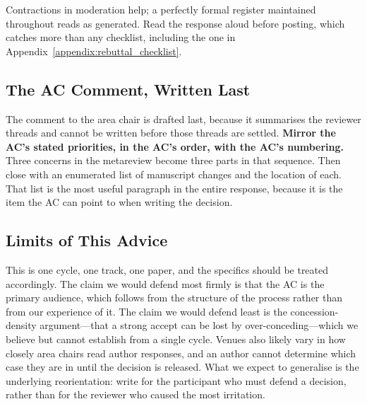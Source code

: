 Contractions in moderation help; a perfectly formal register maintained throughout reads as generated.
Read the response aloud before posting, which catches more than any checklist, including the one in Appendix~\ref{appendix:rebuttal_checklist}.

\subsection*{The AC Comment, Written Last}

The comment to the area chair is drafted last, because it summarises the reviewer threads and cannot be written before those threads are settled.
\textbf{Mirror the AC's stated priorities, in the AC's order, with the AC's numbering.}
Three concerns in the metareview become three parts in that sequence.
Then close with an enumerated list of manuscript changes and the location of each.
That list is the most useful paragraph in the entire response, because it is the item the AC can point to when writing the decision.

\subsection*{Limits of This Advice}

This is one cycle, one track, one paper, and the specifics should be treated accordingly.
The claim we would defend most firmly is that the AC is the primary audience, which follows from the structure of the process rather than from our experience of it.
The claim we would defend least is the concession-density argument---that a strong accept can be lost by over-conceding---which we believe but cannot establish from a single cycle.
Venues also likely vary in how closely area chairs read author responses, and an author cannot determine which case they are in until the decision is released.
What we expect to generalise is the underlying reorientation: write for the participant who must defend a decision, rather than for the reviewer who caused the most irritation.
